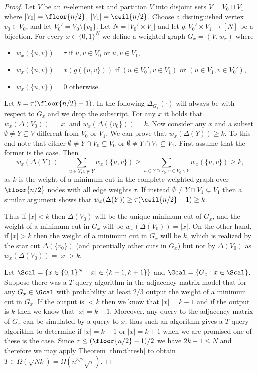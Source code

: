 
\begin{proof}
Let $V$ be an $n$-element set and partition $V$ into disjoint sets $V = V_0 \sqcup V_1$ where $|V_0| = \floor{n/2}$, $|V_1| = \ceil{n/2}$.  Choose a distinguished vertex $v_0 \in V_0$, and let $V_0' = V_0 \setminus \{v_0\}$. 
Let $N = |V_0' \times V_1|$ and let $g : V_0' \times V_1 \rightarrow [N]$ be a bijection.  For every $x \in \{0,1\}^N$ we define a weighted graph $G_x = (V,w_x)$ where
\begin{itemize}
\item
$w_x(\{u,v\}) = \tau$ if $u,v \in V_0$ or $u,v \in V_1$,
\item
$w_x(\{u,v\}) = x(g(\{u,v\}))$ if $(u \in V_0', v \in V_1)$ or $(u \in V_1, v \in V_0')$,
\item
$w_x(\{u,v\}) = 0$ otherwise.
\end{itemize}
Let $k = \tau (\floor{n/2}- 1)$.  In the following $\Delta_{G_x}(\cdot)$ will always be with respect to $G_x$ and we drop the subscript.
For any $x$ it holds that $w_x(\Delta(V_0)) = |x|$ and $w_x(\Delta(\{v_0\})) = k$.
Now consider any $x$ and a subset $\emptyset \neq Y \subsetneq V$ different from $V_0$ or $V_1$.  We can prove that $w_x(\Delta(Y)) \ge k$.  To this end note that either 
$\emptyset \neq Y \cap V_0 \subsetneq V_0$ or $\emptyset \neq Y \cap V_1 \subsetneq V_1$.  First assume that the former is the case.  Then
\[
w_x(\Delta(Y))
= \sum_{u \in Y, v \notin Y} w_x(\{u,v\})
\ge \sum_{u \in Y \cap V_0, v \in V_0 \backslash Y} w_x(\{u,v\})
\ge k,
\]
as $k$ is the weight of a minimum cut in the complete weighted graph over $\floor{n/2}$ nodes with all edge weights $\tau$.  If instead $\emptyset \neq Y \cap V_1 \subsetneq V_1$ 
then a similar argument shows that $w_x(\Delta(Y)) \ge \tau (\ceil{n/2}-1) \ge k$.

Thus if $|x| < k$ then $\Delta(V_0)$ will be the unique minimum cut of $G_x$, and the weight of a minimum cut in $G_x$ will be $w_x(\Delta(V_0)) = |x|$. On the other hand, if 
$|x| > k$ then the weight of a minimum cut in $G_x$ will be $k$, which is realized by the star cut $\Delta(\{v_0\})$ (and potentially other cuts in $G_x$) but 
not by $\Delta(V_0)$ as $w_x(\Delta(V_0)) = |x| > k$.

Let $\Scal = \{x \in \{0,1\}^N : |x| \in \{k-1,k+1\} \}$ and $\Gcal = \{G_x : x \in \Scal\}$.  
Suppose there was a $T$ query algorithm in the adjacency matrix model that for any $G_x \in \Gcal$ with probability at least $2/3$ output the weight of a minimum cut in $G_x$.
If the output is $<k$ then we know that $|x| = k-1$ and if the output is $k$ then we know that $|x| = k+1$.  Moreover, any query to the adjacency matrix of $G_x$ can be simulated 
by a query to $x$, thus such an algorithm gives a $T$ query algorithm to determine if $|x| = k-1$ or $|x| = k+1$ when we are promised one of these is the case.  Since $\tau \le (\floor{n/2}-1)/2$ 
we have $2k+1 \le N$ and therefore we may apply Theorem \ref{thm:thresh} to obtain $T \in \Omega(\sqrt{N k}) = \Omega(n^{3/2}\sqrt{\tau})$.


\end{proof}
